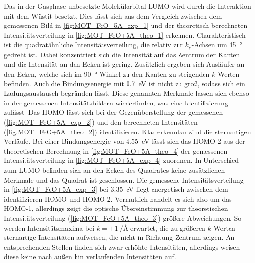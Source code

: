             Das in der Gasphase unbesetzte Molekülorbital LUMO wird durch die Interaktion mit dem Wüstit besetzt.
            Dies lässt sich aus dem Vergleich zwischen dem gemessenen Bild in \autoref{fig:MOT_FeO+5A_exp_1} und der theoretisch berechneten Intensitätsverteilung in \autoref{fig:MOT_FeO+5A_theo_1} erkennen.
            Charakteristisch ist die quadratähnliche Intensitätsverteilung, die relativ zur $k_\text{y}$-Achsen um \SI{45}{\degree} gedreht ist.
            Dabei konzentriert sich die Intensität auf das Zentrum der Kanten und die Intensität an den Ecken ist gering.
            Zusätzlich ergeben sich Ausläufer an den Ecken, welche sich im \SI{90}{\degree}-Winkel zu den Kanten zu steigenden $k$-Werten befinden.
            Auch die Bindungsenergie mit \SI{0.7}{\electronvolt} ist nicht zu groß, sodass sich ein Ladungsaustausch begründen lässt.
            Diese genannten Merkmale lassen sich ebenso in der gemessenen Intensitätsbildern wiederfinden, was eine Identifizierung zulässt.
            Das HOMO lässt sich bei der Gegenüberstellung der gemessenen (\autoref{fig:MOT_FeO+5A_exp_2}) und den berechneten Intensitäten (\autoref{fig:MOT_FeO+5A_theo_2}) identifizieren.
            Klar erkennbar sind die sternartigen Verläufe. %
            Bei einer Bindungsenergie von \SI{4.55}{\electronvolt} lässt sich das HOMO-2 aus der theoretischen Berechnung in \autoref{fig:MOT_FeO+5A_theo_4} der gemessenen Intensitätsverteilung in \autoref{fig:MOT_FeO+5A_exp_4} zuordnen.
            In Unterschied zum LUMO befinden sich an den Ecken des Quadrates keine zusätzlichen Merkmale und das Quadrat ist geschlossen.
            Die gemessene Intensitätsverteilung in \autoref{fig:MOT_FeO+5A_exp_3} bei \SI{3.35}{\electronvolt} liegt energetisch zwischen dem identifizieren HOMO und HOMO-2.
            Vermutlich handelt es sich also um das HOMO-1, allerdings zeigt die optische Übereinstimmung zur theoretischen Intensitätsverteilung (\autoref{fig:MOT_FeO+5A_theo_3}) größere Abweichungen.
            So werden Intensitätsmaxima bei $k= \pm\SI[per-mode=reciprocal]{1}{\per\angstrom}$ erwartet, die zu größeren $k$-Werten sternartige Intensitäten aufweisen, die nicht in Richtung Zentrum zeigen.
            An entsprechenden Stellen finden sich zwar erhöhte Intensitäten, allerdings weisen diese keine nach außen hin verlaufenden Intensitäten auf.
